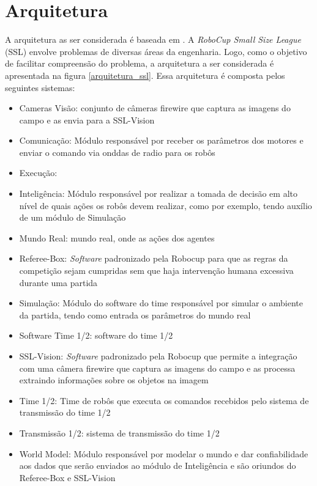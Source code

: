 \section{Arquitetura}

A arquitetura as ser considerada é baseada em \cite{felixnavarro}.
A \textit{RoboCup Small Size League} (SSL) envolve problemas de diversas áreas
da engenharia. Logo, como o objetivo de facilitar compreensão do
problema, a arquitetura a ser considerada é apresentada na figura
\ref{arquitetura_ssl}. Essa arquitetura é composta pelos seguintes
sistemas:

\begin{itemize}
  \item Cameras Visão: conjunto de câmeras firewire que captura as imagens do
        campo e as envia para a SSL-Vision
  \item Comunicação: Módulo responsável por receber os parâmetros
        dos motores e enviar o comando via onddas de radio para os
        robôs
  \item Execução:
  \item Inteligência: Módulo responsável por realizar a tomada de
        decisão em alto nível de quais ações os robôs devem realizar,
        como por exemplo, tendo auxílio de um módulo de Simulação
  \item Mundo Real: mundo real, onde as ações dos agentes
  \item Referee-Box: \textit{Software} padronizado pela Robocup para que as
        regras da competição sejam cumpridas sem que haja intervenção
        humana excessiva durante uma partida
  \item Simulação: Módulo do software do time responsável por simular
        o ambiente da partida, tendo como entrada os parâmetros do mundo
        real
  \item Software Time 1/2: software do time 1/2
  \item SSL-Vision: \textit{Software} padronizado pela Robocup que permite a
        integração com uma câmera firewire que captura as imagens do
        campo e as processa extraindo informações sobre os objetos na
        imagem
  \item Time 1/2: Time de robôs que executa os comandos recebidos pelo
        sistema de transmissão do time 1/2
  \item Transmissão 1/2: sistema de transmissão do time 1/2
  \item World Model: Módulo responsável por modelar o mundo e dar
        confiabilidade aos dados que serão enviados ao módulo de
        Inteligência e são oriundos do Referee-Box e SSL-Vision
\end{itemize}


